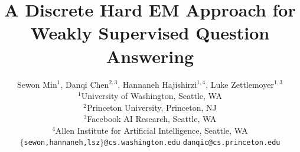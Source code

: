 \documentclass[11pt,a4paper]{article}
\title{
    A Discrete Hard EM Approach for \\
    Weakly Supervised Question Answering
}
\author{Sewon Min$^1$, Danqi Chen$^{2,3}$, Hannaneh Hajishirzi$^{1,4}$, Luke Zettlemoyer$^{1,3}$ \\
$^1$University of Washington, Seattle, WA \\
$^2$Princeton University, Princeton, NJ \\
$^3$Facebook AI Research, Seattle, WA \\
$^4$Allen Institute for Artificial Intelligence, Seattle, WA \\
{\tt $\{$sewon,hannaneh,lsz$\}$@cs.washington.edu}
{\tt danqic@cs.princeton.edu}
}
\date{}
\begin{document}
\maketitle
\newcommand{\myabstract}{
    Many question answering (QA) tasks only provide weak supervision for how the answer should be computed. For example, \trivia\ answers are entities that can be mentioned multiple times in supporting documents, while \drop\ answers can be computed by deriving many different equations from numbers in the reference text.
    In this paper, we show it is possible to convert such tasks into discrete latent variable learning problems with a precomputed, task-specific set of possible {\em solutions} (e.g. different mentions or equations) that contains one correct option.
    We then develop a hard EM learning scheme that computes gradients relative to the most likely solution at each update. 
    Despite its simplicity, we show that this approach significantly outperforms previous methods on six QA tasks, including absolute gains of 2--10\%, and achieves the \sota\ on five of them.
    Using hard updates instead of maximizing marginal likelihood is key to these results as it encourages the model to find the one correct answer, which we show through detailed qualitative analysis.\footnote{Our code is publicly available at \url{https://github.com/shmsw25/qa-hard-em}.}
}

\newcommand{\dataurl}{\url{https://bit.ly/2HK1Fqn}}
\newcommand{\eg}{e.g.}
\newcommand{\discrete}{Reading comprehension with discrete reasoning}
\newcommand{\sota}{state-of-the-art}
\newcommand{\dev}{development}
\newcommand{\trivia}{\textsc{TriviaQA}}
\newcommand{\triviaopen}{\textsc{TriviaQA-open}}
\newcommand{\nqopen}{\textsc{NaturalQuestions-open}}
\newcommand{\narrative}{\textsc{NarrativeQA}}
\newcommand{\nq}{\textsc{Natural Questions}}
\newcommand{\drop}{\textsc{DROP}}
\newcommand{\wikisql}{\textsc{WikiSQL}}

\newcommand{\triviasize}{61,888 & 7,993 & 7,701}
\newcommand{\triviausize}{ 78,785 & 8,837 & 11,313}
\newcommand{\narrativesize}{32,747 & 3,461 & 10,557}
\newcommand{\nqsize}{79,168 & 8,757 & 3,610}
\newcommand{\dropsize}{ 46,973 & 5,850 & - }
\newcommand{\wikisqlsize}{ 56,355 & 8,421 & 15,878 }

\newcommand{\noname}{\textsc{$x \xrightarrow{} Z$}}
\newcommand{\ours}{Ours}
\newcommand{\triviafirstd}{48.6}
\newcommand{\triviammld}{47.0}
\newcommand{\triviaoursd}{50.7}
\newcommand{\nqfirstd}{23.6}
\newcommand{\nqmmld}{26.6}
\newcommand{\nqoursd}{28.8 }
\newcommand{\triviafirstt}{48.1}
\newcommand{\triviammlt}{47.4}
\newcommand{\triviaourst}{50.9}
\newcommand{\nqfirstt}{23.6}
\newcommand{\nqmmlt}{25.8}
\newcommand{\nqourst}{28.1}
\end{document}
